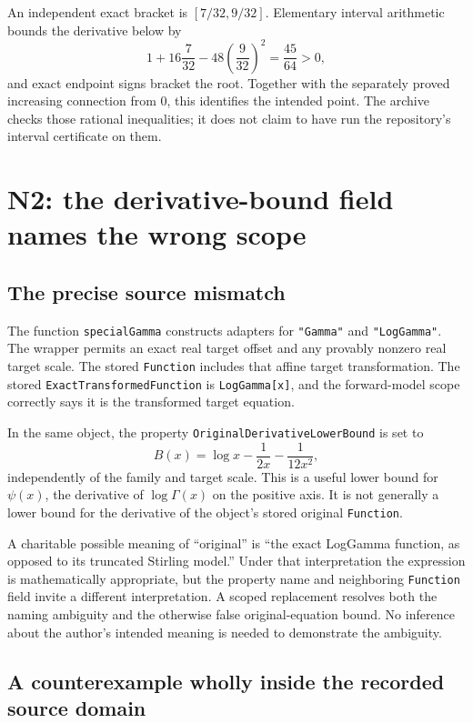 \documentclass[11pt,letterpaper]{article}
\newcommand{\code}[1]{{\small\nolinkurl{#1}}}
\begin{document}
An independent exact bracket is $[7/32,9/32]$. Elementary interval arithmetic bounds the derivative below by
\[
 1+16\frac7{32}-48\left(\frac9{32}\right)^2
 =\frac{45}{64}>0,
\]
and exact endpoint signs bracket the root. Together with the separately proved increasing connection from $0$, this identifies the intended point. The archive checks those rational inequalities; it does not claim to have run the repository's interval certificate on them.

\section{N2: the derivative-bound field names the wrong scope}
\label{sec:n2}

\subsection{The precise source mismatch}

The function \code{specialGamma} constructs adapters for \code{"Gamma"} and \code{"LogGamma"}. The wrapper permits an exact real target offset and any provably nonzero real target scale. The stored \code{Function} includes that affine target transformation. The stored \code{ExactTransformedFunction} is \code{LogGamma[x]}, and the forward-model scope correctly says it is the transformed target equation.\cite{special}

In the same object, the property \code{OriginalDerivativeLowerBound} is set to
\begin{equation}
 B(x)=\log x-\frac1{2x}-\frac1{12x^2},
 \label{eq:B}
\end{equation}
independently of the family and target scale. This is a useful lower bound for $\psi(x)$, the derivative of $\log\Gamma(x)$ on the positive axis. It is not generally a lower bound for the derivative of the object's stored original \code{Function}.

A charitable possible meaning of ``original'' is ``the exact LogGamma function, as opposed to its truncated Stirling model.'' Under that interpretation the expression is mathematically appropriate, but the property name and neighboring \code{Function} field invite a different interpretation. A scoped replacement resolves both the naming ambiguity and the otherwise false original-equation bound. No inference about the author's intended meaning is needed to demonstrate the ambiguity.

\subsection{A counterexample wholly inside the recorded source domain}
\end{document}
